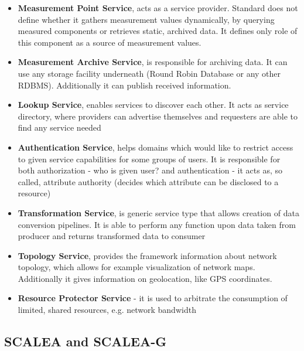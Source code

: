 \begin{itemize}

	\item{ {\bf Measurement Point Service}, acts as a service provider. Standard does not define whether it gathers measurement values dynamically, by querying measured components or retrieves static, archived data. It defines only role of this component as a source of measurement values.}

	\item{ {\bf Measurement Archive Service}, is responsible for archiving data. It can use any storage facility underneath (Round Robin Database or any other RDBMS). Additionally it can publish received information. } 

	\item{ {\bf Lookup Service}, enables services to discover each other. It acts as service directory, where providers can advertise themselves and requesters are able to find any service needed}

	\item{ {\bf Authentication Service}, helps domains which would like to restrict access to given service capabilities for some groups of users. It is responsible for both authorization - who is given user? and authentication - it acts as, so called, attribute authority (decides which attribute can be disclosed to a resource)}

	\item{ {\bf Transformation Service}, is generic service type that allows creation of data conversion pipelines. It is able to perform any function upon data taken from producer and returns transformed data to consumer}

	\item{ {\bf Topology Service}, provides the framework information about network topology, which allows for example visualization of network maps. Additionally it gives information on geolocation, like GPS coordinates.}

	\item{ {\bf Resource Protector Service} - it is used to arbitrate the consumption of limited, shared resources, e.g. network bandwidth}
\end{itemize}

\subsection{SCALEA and SCALEA-G}


